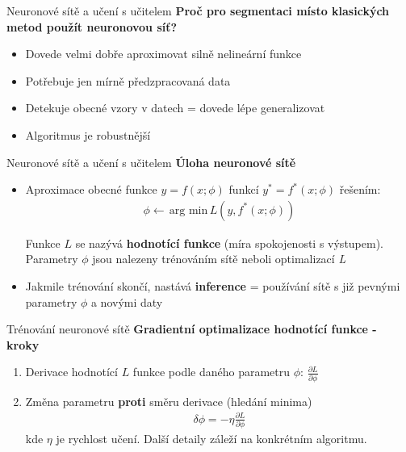 \documentclass[aspectratio=1610]{beamer}
\begin{document}
\begin{frame}{Neuronové sítě a učení s učitelem}
\textbf{Proč pro segmentaci místo klasických metod použít neuronovou síť?}
\begin{itemize}
	\item Dovede velmi dobře aproximovat silně nelineární funkce
	\item Potřebuje jen mírně předzpracovaná data
	\item Detekuje obecné vzory v datech = dovede lépe generalizovat
	\item Algoritmus je robustnější
	
\end{itemize}
\end{frame}
\begin{frame}{Neuronové sítě a učení s učitelem}
\textbf{Úloha neuronové sítě}
\begin{itemize}
\item Aproximace obecné funkce $y=f(x;\phi)$ funkcí $ y^* = f^*(x;\phi)	$ řešením:
\vspace{3mm}					
\begin{gather}
\phi \leftarrow \, \text{arg min} \, L(y, f^*(x;\phi))	
\end{gather} 

Funkce $ L $ se nazývá \textbf{hodnotící funkce} (míra spokojenosti s výstupem). Parametry $ \phi $ jsou nalezeny trénováním sítě neboli optimalizací \textit{L}
\item Jakmile trénování skončí, nastává \textbf{inference} = používání sítě s již pevnými parametry $ \phi $ a novými daty
\end{itemize}
\end{frame}
\begin{frame}{Trénování neuronové sítě}
\textbf{Gradientní optimalizace hodnotící funkce - kroky}
\begin{enumerate}
	\item Derivace hodnotící $ L $ funkce podle daného parametru $ \phi $: $ \frac{\partial L}{\partial \phi} $
	\item Změna parametru \textbf{proti} směru derivace (hledání minima)
	\begin{gather}
	\delta \phi = - \eta \frac{\partial L}{\partial \phi}
	\end{gather}	
	\noindent kde $ \eta $ je rychlost učení. Další detaily záleží na konkrétním algoritmu.	
\end{enumerate}
	\begin{center}		
\end{center}
\end{frame}
\end{document}
